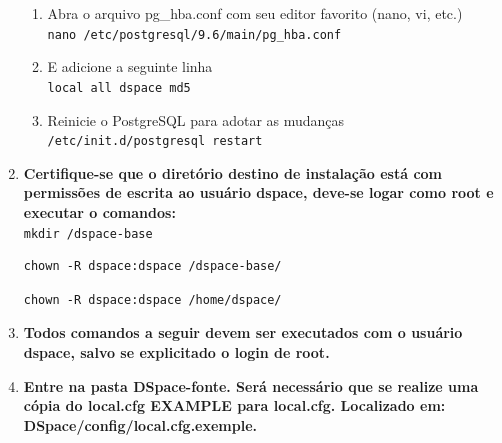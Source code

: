 \documentclass[12pt,hidelinks]{article}
\begin{document}
\begin{enumerate}
        \begin{enumerate}
            \item Abra o arquivo pg\_hba.conf com seu editor favorito (nano, vi, etc.)\\
            
                \texttt{nano /etc/postgresql/9.6/main/pg\_hba.conf}\\

            \item E adicione a seguinte linha\\
            
                \texttt{local     all     dspace    md5}\\
                
             \item Reinicie o PostgreSQL para adotar as mudanças\\
            
                \texttt{/etc/init.d/postgresql restart}\\

            \end{enumerate}
            
        \item \textbf{Certifique-se que o diretório destino de instalação está com permissões de escrita ao usuário dspace, deve-se logar como root e executar o comandos:}\\
        
            \texttt{mkdir /dspace-base}
            
             \begin{verbatim}
chown -R dspace:dspace /dspace-base/
            \end{verbatim}
            
            \begin{verbatim}
chown -R dspace:dspace /home/dspace/
            \end{verbatim}
            
        \item \textbf{Todos comandos a seguir devem ser executados com o usuário dspace, salvo se explicitado o login de root.}\\
        
        \item \textbf{Entre na pasta DSpace-fonte.  Será necessário que se realize uma cópia do local.cfg EXAMPLE para local.cfg. Localizado em: DSpace/config/local.cfg.exemple.}\\
        

\end{enumerate}
\end{document}

